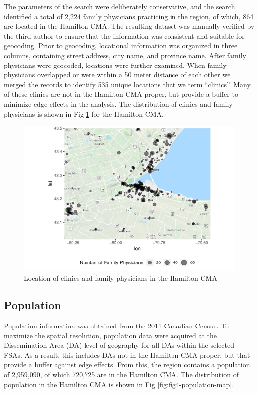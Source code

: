 \documentclass[10pt,letterpaper]{article}
\begin{document}
The parameters of the search were deliberately conservative, and the
search identified a total of 2,224 family physicians practicing in the
region, of which, 864 are located in the Hamilton CMA. The resulting
dataset was manually verified by the third author to ensure that the
information was consistent and suitable for geocoding. Prior to
geocoding, locational information was organized in three columns,
containing street address, city name, and province name. After family
physicians were geocoded, locations were further examined. When family
physicians overlapped or were within a 50 meter distance of each other
we merged the records to identify 535 unique locations that we term
``clinics''. Many of these clinics are not in the Hamilton CMA proper,
but provide a buffer to minimize edge effects in the analysis. The
distribution of clinics and family physicians is shown in Fig
\ref{fig:fig3-clinic-map} for the Hamilton CMA.

\begin{figure}
\centering
\includegraphics{Supply_and_Demand_Inflation_in_FCA_Methods_v2.0_files/figure-latex/fig3-clinic-map-1.pdf}
\caption{\label{fig:fig3-clinic-map}Location of clinics and family
physicians in the Hamilton CMA}
\end{figure}

\subsection{Population}\label{population}

Population information was obtained from the 2011 Canadian Census. To
maximize the spatial resolution, population data were acquired at the
Dissemination Area (DA) level of geography for all DAs within the
selected FSAs. As a result, this includes DAs not in the Hamilton CMA
proper, but that provide a buffer against edge effects. From this, the
region contains a population of 2,959,090, of which 720,725 are in the
Hamilton CMA. The distribution of population in the Hamilton CMA is
shown in Fig \ref{fig:fig4-population-map}.
\end{document}
